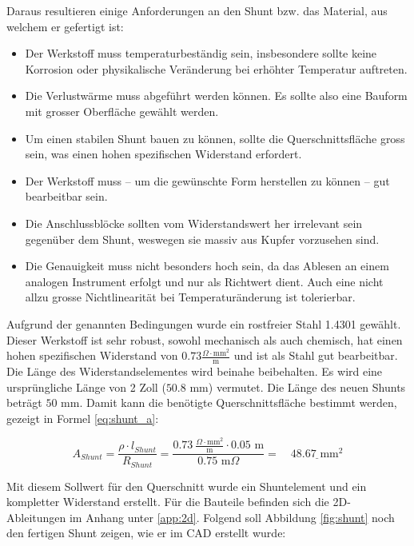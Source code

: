 Daraus resultieren einige Anforderungen an den Shunt bzw. das Material, aus welchem er gefertigt ist: \begin{itemize}
	\item Der Werkstoff muss temperaturbeständig sein, insbesondere sollte keine Korrosion oder physikalische Veränderung bei erhöhter Temperatur auftreten.
	\item Die Verlustwärme muss abgeführt werden können. Es sollte also eine Bauform mit grosser Oberfläche gewählt werden.
	\item Um einen stabilen Shunt bauen zu können, sollte die Querschnittsfläche gross sein, was einen hohen spezifischen Widerstand erfordert.
	\item Der Werkstoff muss -- um die gewünschte Form herstellen zu können -- gut bearbeitbar sein.
	\item Die Anschlussblöcke sollten vom Widerstandswert her irrelevant sein gegenüber dem Shunt, weswegen sie massiv aus Kupfer vorzusehen sind.
	\item Die Genauigkeit muss nicht besonders hoch sein, da das Ablesen an einem analogen Instrument erfolgt und nur als Richtwert dient. Auch eine nicht allzu grosse Nichtlinearität bei Temperaturänderung ist tolerierbar.
\end{itemize}

Aufgrund der genannten Bedingungen wurde ein rostfreier Stahl 1.4301 \cite{4301} gewählt. Dieser Werkstoff ist sehr robust, sowohl mechanisch als auch chemisch, hat einen hohen spezifischen Widerstand von $0.73 \frac{\Omega \cdot \text{mm}^2}{\text{m}}$ und ist als Stahl gut bearbeitbar. Die Länge des Widerstandselementes wird beinahe beibehalten. Es wird eine ursprüngliche Länge von 2 Zoll ($50.8$ mm) vermutet. Die Länge des neuen Shunts beträgt $50$ mm. Damit kann die benötigte Querschnittsfläche bestimmt werden, gezeigt in Formel \ref{eq:shunt_a}:

\begin{equation}
	A_{Shunt}=\frac{\rho\cdot l_{Shunt}}{R_{Shunt}}=\frac{0.73\ \frac{\Omega\cdot\text{mm}^2}{\text{m}}\cdot 0.05\text{ m}}{0.75\text{ m}\Omega}=\quad\underline{48.67\text{ mm}^2}
\label{eq:shunt_a}
\end{equation}

Mit diesem Sollwert für den Querschnitt wurde ein Shuntelement und ein kompletter Widerstand erstellt. Für die Bauteile befinden sich die 2D-Ableitungen im Anhang unter \ref{app:2d}. Folgend soll Abbildung \ref{fig:shunt} noch den fertigen Shunt zeigen, wie er im CAD erstellt wurde:

